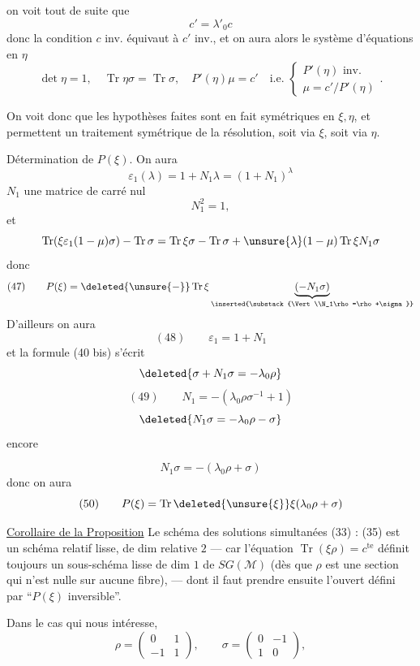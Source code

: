 
on voit tout de suite que
\[
c'=\lambda'_0c
\]
donc la condition $c$ inv. équivaut à $c'$ inv.,
et on aura alors le système d'équations en $\eta$
\[
\det\eta=1,\quad
\operatorname{Tr}\eta\sigma=\operatorname{Tr}\sigma,\quad
P'(\eta)\mu=c'\quad\text{i.e. }
\left\{
\begin{gathered}
P'(\eta)\text{ inv.}\\
\mu=c'/P'(\eta)
\end{gathered}
\right.
.
\]

On voit donc que les hypothèses faites sont en fait symétriques en
$\xi,\eta$, et permettent un traitement symétrique de la résolution,
soit via $\xi$, soit via $\eta$.

Détermination de $P(\xi)$. On aura
\[
\varepsilon_1(\lambda)=1+N_1\lambda=(1+N_1)^\lambda
\]
$N_1$ une matrice de carré nul
\[
N_1^2=1,
\]
et
\[
\operatorname{Tr}(\xi\varepsilon_1(1-\mu)\sigma)-\operatorname{Tr}\sigma
=\operatorname{Tr}\xi\sigma-\operatorname{Tr}\sigma
+\unsure{\lambda}(1-\mu)\operatorname{Tr}\xi N_1\sigma
\]
donc
\[
(47)\qquad
P(\xi)=\deleted{\unsure{-}}\operatorname{Tr}\xi
\underbrace{(-N_1\sigma)}_{\inserted{\substack{\Vert\\N_1\rho=\rho+\sigma}}}
\]
D'ailleurs  on aura
\[
(48)\qquad \varepsilon_1=1+N_1
\]
et la formule (40 bis) s'écrit
\[
\deleted{\sigma+N_1\sigma=-\lambda_0\rho}
\]
\[
(49)\qquad N_1=-(\lambda_0\rho\sigma^{-1}+1)
\]
\[
\deleted{N_1\sigma=-\lambda_0\rho-\sigma}
\]
  encore


\[
N_1\sigma=-(\lambda_0\rho+\sigma)
\]
donc on aura
\[
(50)\qquad
P(\xi)=\operatorname{Tr}\deleted{\unsure{\xi}}\xi(\lambda_0\rho+\sigma)
\]

\uline{Corollaire de la Proposition} Le schéma des solutions
 simultanées (33) : (35)
 est un schéma relatif lisse,
de dim relative $2$ --- car l'équation $\operatorname{Tr}(\xi\rho)=c^{\mathrm{te}}$
définit toujours un sous-schéma lisse de dim $1$
de  $SG(\mathcal{M})$
(dès que $\rho$ est une section qui n'est nulle sur aucune fibre),
--- dont il faut prendre ensuite l'ouvert défini par
“$P(\xi)$ inversible”.

Dans le cas qui nous intéresse,
\[
\rho=\begin{pmatrix}0&1\\-1&1\end{pmatrix},\qquad
\sigma=\begin{pmatrix}0&-1\\1&0\end{pmatrix},
\]

